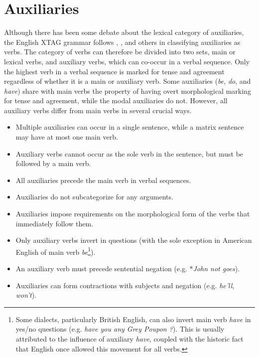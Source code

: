 \chapter{Auxiliaries} 
\label{auxiliaries} 
 
Although there has been some debate about the lexical category of auxiliaries, 
the English XTAG grammar follows \cite{mccawley88}, \cite{haegeman91}, and 
others in classifying auxiliaries as verbs. The category of verbs can therefore 
be divided into two sets, main or lexical verbs, and auxiliary verbs, which can 
co-occur in a verbal sequence.  Only the highest verb in a verbal sequence is 
marked for tense and agreement regardless of whether it is a main or auxiliary 
verb.  Some auxiliaries ({\it be}, {\it do}, and {\it have}) share with main 
verbs the property of having overt morphological marking for tense and 
agreement, while the modal auxiliaries do not.  However, all auxiliary verbs 
differ from main verbs in several crucial ways. 
 
\begin{itemize} 
 
\item Multiple auxiliaries can occur in a single sentence, while a matrix 
sentence may have at most one main verb. 
 
\item Auxiliary verbs cannot occur as the sole verb in the sentence, but must 
be followed by a main verb. 
 
\item All auxiliaries precede the main verb in verbal sequences. 
 
\item Auxiliaries do not subcategorize for any arguments. 
 
\item Auxiliaries impose requirements on the morphological form of the verbs 
that immediately follow them. 
 
\item Only auxiliary verbs invert in questions (with the sole exception in 
American English of main verb {\it be}\footnote{Some dialects, particularly British English, can also invert main verb {\it have} in yes/no questions (e.g. {\it have you any Grey Poupon ?}).  This is usually attributed to the influence of auxiliary {\it have}, coupled with the historic fact that English once allowed this movement for all verbs.\label{have-footnote}}). 
 
\item An auxiliary verb must precede sentential negation (e.g. $\ast${\it John not goes}). 
 
\item Auxiliaries can form contractions with subjects and negation (e.g. {\it he'll}, {\it won't}). 
 
\end{itemize} 
 
